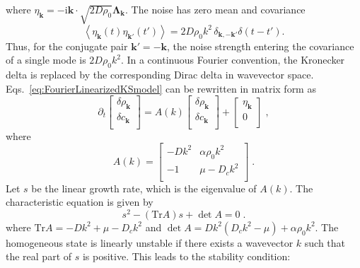\documentclass{article}
\begin{document}
where $\eta_{\mathbf k}=-\mathrm{i}\mathbf k\cdot\sqrt{2D\rho_0}\boldsymbol{\Lambda}_{\mathbf k}$. The noise has zero mean and covariance
\begin{equation}
    \left\langle\eta_{\mathbf k}(t)\eta_{\mathbf k'}(t')\right\rangle
    =2D\rho_0k^2\,\delta_{\mathbf k,-\mathbf k'}\delta(t-t').
    \label{eq:FourierNoiseCorrelation}
\end{equation}
Thus, for the conjugate pair $\mathbf k'=-\mathbf k$, the noise strength entering the covariance of a single mode is $2D\rho_0k^2$. In a continuous Fourier convention, the Kronecker delta is replaced by the corresponding Dirac delta in wavevector space.
Eqs.~\eqref{eq:FourierLinearizedKSmodel} can be rewritten in matrix form as
\begin{equation}
    \partial _t\left[ \begin{array}{c}
        \delta \rho _{\mathbf{k}}\\
        \delta c_{\mathbf{k}}\\
    \end{array} \right] =A\left( k \right) \left[ \begin{array}{c}
        \delta \rho _{\mathbf{k}}\\
        \delta c_{\mathbf{k}}\\
    \end{array} \right] +\left[ \begin{array}{c}
        \eta _{\mathbf{k}}\\
        0\\
    \end{array} \right] \;,
    \label{eq:matrixFormLinearizedKSmodel}
\end{equation}
where
\begin{equation}
    A(k)=\left[ \begin{matrix}
        -Dk^2&		\alpha \rho _0k^2\\
        -1&		\mu -D_ck^2\\
    \end{matrix} \right] \;.
\end{equation}
Let $s$ be the linear growth rate, which is the eigenvalue of $A(k)$. The characteristic equation is given by
\begin{equation}
    s^2-(\mathrm{Tr}A)s+\det A=0\;.
\end{equation}
where $\mathrm{Tr}A = -Dk^2 + \mu - D_ck^2$ and $\det A = Dk^2(D_ck^2 - \mu) + \alpha \rho_0 k^2$. The homogeneous state is linearly unstable if there exists a wavevector $k$ such that the real part of $s$ is positive. This leads to the stability condition:
\end{document}
